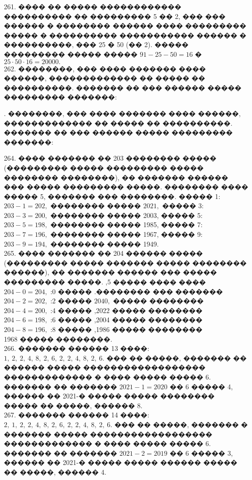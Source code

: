 \documentclass[12pt]{article}
\begin{document}
261. ���� �� ����� ������������ ���������� �� ��������� 5 �� 2, ��� ��� ������ � �������� ������ ���� ��������� ����� � ���������� ����������� ������ � ����������, ��� 25 � 50 (�� 2). ����� ��������� ����� ����� $91-25-50=16$ � $25\cdot50\cdot16=20000.$\\
262. ��������, ��� ���� ������� ���� ������, ������������� �� ����� �� ����������. ������� �� ��� ������ ����� ��������� �������:
\begin{center}
\begin{figure}[ht!]
\end{figure}
\end{center}
\newpage{}. ��������, ��� ���� ������� ���� ������, ������������� �� ����� �� ����������. ������� �� ��� ������ ����� ��������� �������:
\begin{center}
\begin{figure}[ht!]
\end{figure}
\end{center}
264. ���� ������� �� 203 �������� ����� (��������� ����� ��������� ����� �������� ��������), �� ������� ������ ��� ����� ��������� �����. �������� ���� ����� 5, ������� ��� ��������. ����� 1: $203-1=202,$ �������� ����� $2021,$ ����� 3: $203-3=200,$ �������� ����� 2003, ����� 5: $203-5=198,$ �������� ����� 1985, ����� 7: $203-7=196,$ �������� ����� 1967, ����� 9: $203-9=194,$ �������� ����� 1949.\\
265. ���� ������� �� 204 ������ ����� (��������� ����� ������� ����� �������� ������), �� ������� ������ ��� ����� ��������� �����. ׸���� ���� ����� 5, ������� ��� ��������. ����� 0: $204-0=204,$ �������� ����� $2040,$ ����� 2: $204-2=202,$ �������� ����� 2022, ����� 4: $204-4=200,$ �������� ����� 2004, ����� 6: $204-6=198,$ �������� ����� 1986, ����� 8: $204-8=196,$ �������� ����� 1968.\\
266. ������� ������ 13 ����: $1,\ 2,\ 2,\ 4,\ 8,\ 2,\ 6,\ 2,\ 2,\ 4,\ 8,\ 2,\ 6.$ ��� �� �����, ������� �� ������ ����� ������������������ ������������� � ���� ����� ����� 6. ������� �� ������� $2021-1=2020$ �� 6 ����� 4, ������ �� 2021-� ����� ����� �������� ����� �� �����, ������ 8.\\
267. ������� ������ 14 ����: $2,\ 1,\ 2,\ 2,\ 4,\ 8,\ 2,\ 6,\ 2,\ 2,\ 4,\ 8,\ 2,\ 6.$ ��� �� �����, ������� � ������� ����� ������������������ ������������� � ���� ����� ����� 6. ������� �� ������� $2021-2=2019$ �� 6 ����� 3, ������ �� 2021-� ����� ����� ������ ����� �� �����, ������ 4.\\
\end{document}
